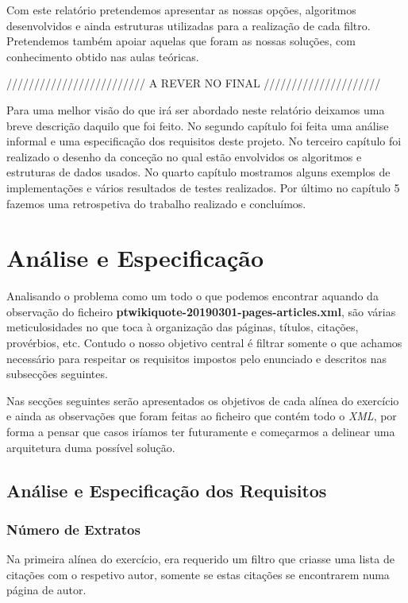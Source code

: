 \documentclass[11pt,a4paper]{report}
\begin{document}
Com este relatório pretendemos apresentar as nossas opções, algoritmos desenvolvidos e ainda estruturas utilizadas para a realização de cada filtro. Pretendemos também apoiar aquelas que foram as nossas soluções, com conhecimento obtido nas aulas teóricas.

///////////////////////// A REVER NO FINAL /////////////////////

Para uma melhor visão do que irá ser abordado neste relatório deixamos uma breve descrição daquilo que foi feito. No segundo capítulo foi feita uma análise informal e uma especificação dos requisitos deste projeto. No terceiro capítulo foi realizado o desenho da conceção no qual estão envolvidos os algoritmos e estruturas de dados usados. No quarto capítulo mostramos alguns exemplos de implementações e vários resultados de testes realizados. Por último no capítulo 5 fazemos uma retrospetiva do trabalho realizado e concluímos.



\chapter{Análise e Especificação}
\label{chap:analise}

Analisando o problema como um todo o que podemos encontrar aquando da observação do ficheiro \textbf{ptwikiquote-20190301-pages-articles.xml}, são várias meticulosidades no que toca à organização das páginas, títulos, citações, provérbios, etc. Contudo o nosso objetivo central é filtrar somente o que achamos necessário para respeitar os requisitos impostos pelo enunciado e descritos nas subsecções seguintes.

Nas secções seguintes serão apresentados os objetivos de cada alínea do exercício e ainda as observações que foram feitas ao ficheiro que contém todo o \emph{XML}, por forma a pensar que casos iríamos ter futuramente e começarmos a delinear uma arquitetura duma possível solução.

\section{Análise e Especificação dos Requisitos}
\subsection{Número de Extratos}

Na primeira alínea do exercício, era requerido um filtro que criasse uma lista de citações com o respetivo autor, somente se estas citações se encontrarem numa página de autor.
\end{document}
